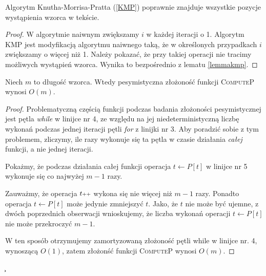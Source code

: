 \begin{theorem}
	Algorytm Knutha-Morrisa-Pratta (\ref{KMP}) poprawnie znajduje wszystkie pozycje wystąpienia wzorca w tekście. 
	\begin{proof}
		W algorytmie naiwnym zwiększamy $i$ w każdej iteracji o 1. Algorytm KMP jest modyfikacją algorytmu naiwnego taką, że w określonych przypadkach $i$ zwiększamy o więcej niż 1. Należy pokazać, że przy takiej operacji nie tracimy możliwych wystąpień wzorca. Wynika to bezpośrednio z lematu \ref{lemmakmp}.
	\end{proof}
\end{theorem}

\begin{lemma}
	\label{zlozonoscComputeP}
	Niech $m$ to długość wzorca. Wtedy pesymistyczna złożoność funkcji \textsc{ComputeP} wynosi $O(m)$.
	\begin{proof}
		Problematyczną częścią funkcji podczas badania złożoności pesymistycznej jest pętla \textit{while} w linijce nr 4, 
		ze względu na jej niedeterministyczną liczbę wykonań podczas jednej iteracji pętli \textit{for} z linijki nr 3. Aby poradzić sobie z tym problemem, zliczymy, ile razy wykonuje się ta pętla
		w czasie działania \textit{całej} funkcji, a nie jednej iteracji.
		 
		Pokażmy, że podczas działania całej funkcji operacja $t \gets P[t]$ w linijce nr 5 wykonuje się co najwyżej $m-1$ razy.
		
		Zauważmy, że operacja $t\scalebox{0.75}{++}$ wykona się nie więcej niż $m-1$ razy.
		Ponadto operacja $t \gets P[t]$ może jedynie zmniejszyć $t$. Jako, że $t$ nie może
		być ujemne, z dwóch poprzednich obserwacji wnioskujemy, że
		liczba wykonań operacji $t \gets P[t]$ nie może przekroczyć $m-1$.
		
		W ten sposób otrzymujemy zamortyzowaną złożoność pętli while w linijce nr. 4,
		wynoszącą $O(1)$, zatem złożonść funkcji \textsc{ComputeP} wynosi $O(m)$.
		
	\end{proof}	
	\c
\end{lemma}


